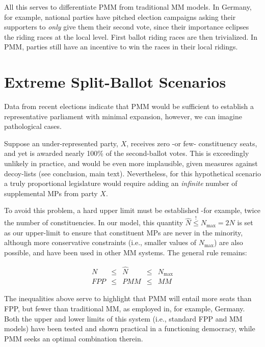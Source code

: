 All this serves to differentiate PMM from traditional MM models. 
In Germany, for example, national parties have pitched election campaigns asking their supporters to \emph{only} give them their second vote, since their importance eclipses the riding races at the local level. First ballot riding races are then trivialized. 
In PMM, parties still have an incentive to win the races in their local ridings.



\section{Extreme Split-Ballot Scenarios}

Data from recent elections indicate that PMM would be sufficient to establish a representative parliament with minimal expansion, however, we can imagine pathological cases. 

Suppose an under-represented party, $X$, receives zero \--or few\-- constituency seats, and yet is awarded nearly 100\% of the second-ballot votes.
This is exceedingly unlikely in practice, and would be even more implausible, given measures against decoy-lists (see conclusion, main text).
Nevertheless, for this hypothetical scenario a truly proportional legislature would require adding an \emph{infinite} number of supplemental MPs from party \textbf{$X$}.

To avoid this problem, a hard upper limit must be established \--for example, twice the number of constituencies. In our model, this quantity $\hat N \stackrel{!}{\le} N_{\textrm{max}} = 2 N$ is set as our upper-limit to ensure that constituent MPs are never in the minority, although more conservative constraints (i.e., smaller values of $N_{\textrm{max}}$) are also possible, and have been used in other MM systems. 
The general rule remains:

\begin{align}
\label{eq:Nlimits}
N &\le& \hat{N} &\le& N_{\textrm{max}} \\
FPP &\le& PMM &\le& MM
\end{align}

The inequalities above serve to highlight that PMM will entail more seats than FPP, but fewer than traditional MM, as employed in, for example, Germany. 
Both the upper and lower limits of this system (i.e., standard FPP and MM models) have been tested and shown practical in a functioning democracy, while PMM seeks an optimal combination therein.

